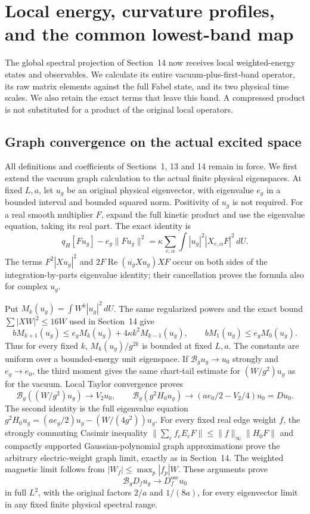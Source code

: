 \section{Local energy, curvature profiles, and the common lowest-band map}
\label{sec:local-band}

The global spectral projection of Section~14 now receives local
weighted-energy states and observables. We calculate its entire
vacuum-plus-first-band operator, its raw matrix elements against the
full Fabel state, and its two physical time scales. We also retain the
exact terms that leave this band. A compressed product is not substituted
for a product of the original local operators.

\subsection{Graph convergence on the actual excited space}

All definitions and coefficients of Sections~1, 13 and 14 remain in
force. We first extend the vacuum graph calculation to the actual finite
physical eigenspaces. At fixed $L,a$, let $u_g$ be an original physical
eigenvector, with eigenvalue $e_g$ in a bounded interval and bounded
squared norm. Positivity of $u_g$ is not required. For a real smooth
multiplier $F$, expand the full kinetic product and use the eigenvalue
equation, taking its real part. The exact identity is
\begin{equation}\label{eq:local-excited-transform}
 q_H[Fu_g]-e_g\|Fu_g\|^2
 =\kappa\sum_{e,\alpha}\int |u_g|^2|X_{e,\alpha}F|^2\,dU.
\end{equation}
The terms $F^2|Xu_g|^2$ and $2F\operatorname{Re}(\overline{u_g}Xu_g)XF$
occur on both sides of the integration-by-parts eigenvalue identity;
their cancellation proves the formula also for complex $u_g$.

Put $M_k(u_g)=\int W^k|u_g|^2\,dU$. The same regularized powers and
the exact bound $\sum|XW|^2\le16W$ used in Section~14 give
\[
 bM_{k+1}(u_g)\le e_gM_k(u_g)+4\kappa k^2M_{k-1}(u_g),
 \qquad bM_1(u_g)\le e_gM_0(u_g).
\]
Thus for every fixed $k$, $M_k(u_g)/g^{2k}$ is bounded at fixed $L,a$.
The constants are uniform over a bounded-energy unit eigenspace.
If $\mathcal B_gu_g\to u_0$ strongly and $e_g\to e_0$,
the third moment gives the same chart-tail estimate for
$(W/g^2)u_g$ as for the vacuum. Local Taylor convergence proves
\[
 \mathcal B_g((W/g^2)u_g)\to V_2u_0,\qquad
 \mathcal B_g(g^2H_0u_g)\to
          (ae_0/2-V_2/4)u_0=Du_0 .
\]
The second identity is the full eigenvalue equation
$g^2H_0u_g=(ae_g/2)u_g-(W/(4g^2))u_g$.
For every fixed real edge weight $f$, the strongly commuting Casimir
inequality
$\|\sum_ef_eE_eF\|\le\|f\|_\infty\|H_0F\|$
and compactly supported Gaussian-polynomial graph approximations prove
the arbitrary electric-weight graph limit, exactly as in Section~14.
The weighted magnetic limit follows from
$|W_f|\le\max_p|f_p|W$. These arguments prove
\begin{equation}\label{eq:local-graph}
 \mathcal B_gD_fu_g\longrightarrow D_f^{\mathrm{osc}}u_0
\end{equation}
in full $L^2$, with the original factors $2/a$ and $1/(8a)$,
for every eigenvector limit in any fixed finite physical spectral range.

